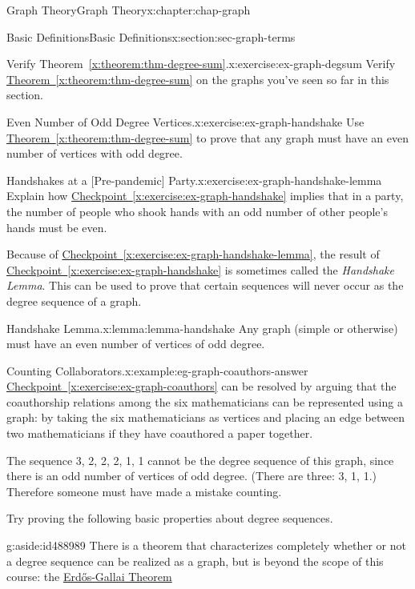 \documentclass[oneside,10pt,]{book}
\newcommand{\xreffont}{\relax}
\numberwithin{equation}{section}
\begin{document}
\begin{chapterptx}{Graph Theory}{}{Graph Theory}{}{}{x:chapter:chap-graph}
\begin{sectionptx}{Basic Definitions}{}{Basic Definitions}{}{}{x:section:sec-graph-terms}
\begin{inlineexercise}{Verify Theorem~{\xreffont\ref*{x:theorem:thm-degree-sum}}.}{x:exercise:ex-graph-degsum}
Verify \hyperref[x:theorem:thm-degree-sum]{Theorem~{\xreffont\ref{x:theorem:thm-degree-sum}}} on the graphs you've seen so far in this section.%
\end{inlineexercise}
\begin{inlineexercise}{Even Number of Odd Degree Vertices.}{x:exercise:ex-graph-handshake}%
Use \hyperref[x:theorem:thm-degree-sum]{Theorem~{\xreffont\ref{x:theorem:thm-degree-sum}}} to prove that any graph must have an even number of vertices with odd degree.%
\end{inlineexercise}
\begin{inlineexercise}{Handshakes at a [Pre-pandemic] Party.}{x:exercise:ex-graph-handshake-lemma}%
Explain how \hyperref[x:exercise:ex-graph-handshake]{Checkpoint~{\xreffont\ref{x:exercise:ex-graph-handshake}}} implies that in a party, the number of people who shook hands with an odd number of other people's hands must be even.%
\end{inlineexercise}
Because of \hyperref[x:exercise:ex-graph-handshake-lemma]{Checkpoint~{\xreffont\ref{x:exercise:ex-graph-handshake-lemma}}}, the result of \hyperref[x:exercise:ex-graph-handshake]{Checkpoint~{\xreffont\ref{x:exercise:ex-graph-handshake}}} is sometimes called the \emph{Handshake Lemma}. This can be used to prove that certain sequences will never occur as the degree sequence of a graph.%
\begin{lemma}{Handshake Lemma.}{}{x:lemma:lemma-handshake}%
Any graph (simple or otherwise) must have an even number of vertices of odd degree.%
\end{lemma}
\begin{example}{Counting Collaborators.}{x:example:eg-graph-coauthors-answer}%
\hyperref[x:exercise:ex-graph-coauthors]{Checkpoint~{\xreffont\ref{x:exercise:ex-graph-coauthors}}} can be resolved by arguing that the coauthorship relations among the six mathematicians can be represented using a graph: by taking the six mathematicians as vertices and placing an edge between two mathematicians if they have coauthored a paper together.%
\par
The sequence 3, 2, 2, 2, 1, 1 cannot be the degree sequence of this graph, since there is an odd number of vertices of odd degree. (There are three: 3, 1, 1.) Therefore someone must have made a mistake counting.%
\end{example}
Try proving the following basic properties about degree sequences.%
\begin{aside}{}{g:aside:id488989}%
There is a theorem that characterizes completely whether or not a degree sequence can be realized as a graph, but is beyond the scope of this course: the \href{https://en.wikipedia.org/wiki/Erd\%C5\%91s\%E2\%80\%93Gallai_theorem}{Erdős-Gallai Theorem}%

\end{aside}
\end{sectionptx}
\end{chapterptx}
\end{document}
